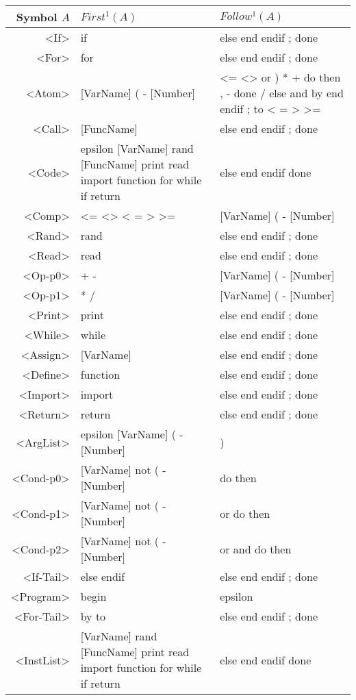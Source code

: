 \begin{longtable}{r p{7cm} p{7cm}}
\textnormal{Symbol} $A$ & $First^1(A)$ & $Follow^1(A)$\\ \hline
<If> & if  & else end endif ; done \\ \hline
<For> & for  & else end endif ; done \\ \hline
<Atom> & [VarName] ( - [Number]  & <= <> or ) * + do then , - done / else and by end endif ; to < = > >= \\ \hline
<Call> & [FuncName]  & else end endif ; done \\ \hline
<Code> & epsilon [VarName] rand [FuncName] print read import function for while if return  & else end endif done \\ \hline
<Comp> & <= <> < = > >=  & [VarName] ( - [Number] \\ \hline
<Rand> & rand  & else end endif ; done \\ \hline
<Read> & read  & else end endif ; done \\ \hline
<Op-p0> & + -  & [VarName] ( - [Number] \\ \hline
<Op-p1> & * /  & [VarName] ( - [Number] \\ \hline
<Print> & print  & else end endif ; done \\ \hline
<While> & while  & else end endif ; done \\ \hline
<Assign> & [VarName]  & else end endif ; done \\ \hline
<Define> & function  & else end endif ; done \\ \hline
<Import> & import  & else end endif ; done \\ \hline
<Return> & return  & else end endif ; done \\ \hline
<ArgList> & epsilon [VarName] ( - [Number]  & ) \\ \hline
<Cond-p0> & [VarName] not ( - [Number]  & do then \\ \hline
<Cond-p1> & [VarName] not ( - [Number]  & or do then \\ \hline
<Cond-p2> & [VarName] not ( - [Number]  & or and do then \\ \hline
<If-Tail> & else endif  & else end endif ; done \\ \hline
<Program> & begin  & epsilon \\ \hline
<For-Tail> & by to  & else end endif ; done \\ \hline
<InstList> & [VarName] rand [FuncName] print read import function for while if return  & else end endif done \\ \hline

\end{longtable}
